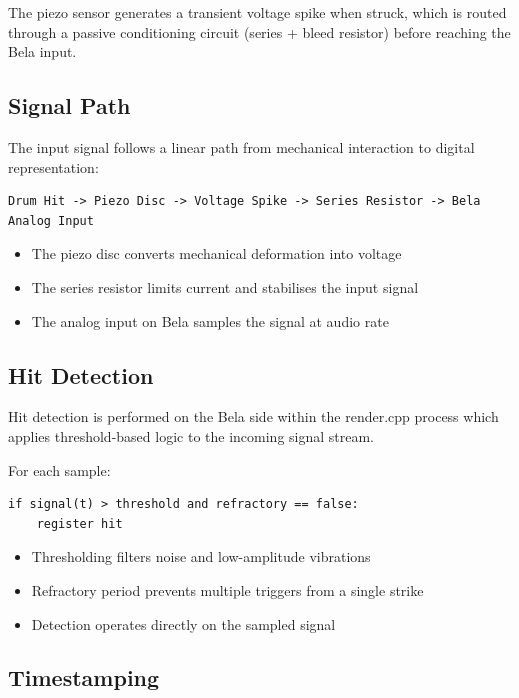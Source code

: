 The piezo sensor generates a transient voltage spike when struck, which
is routed through a passive conditioning circuit (series + bleed
resistor) before reaching the Bela input.

\subsection{Signal Path}\label{signal-path}

The input signal follows a linear path from mechanical interaction to
digital representation:

\begin{lstlisting}
Drum Hit -> Piezo Disc -> Voltage Spike -> Series Resistor -> Bela Analog Input
\end{lstlisting}

\begin{itemize}
\item
  The piezo disc converts mechanical deformation into voltage
\item
  The series resistor limits current and stabilises the input signal
\item
  The analog input on Bela samples the signal at audio rate
\end{itemize}

\subsection{Hit Detection}\label{hit-detection}

Hit detection is performed on the Bela side within the render.cpp
process which applies threshold-based logic to the incoming signal
stream.

For each sample:

\begin{lstlisting}
if signal(t) > threshold and refractory == false:
    register hit
\end{lstlisting}

\begin{itemize}
\item
  Thresholding filters noise and low-amplitude vibrations
\item
  Refractory period prevents multiple triggers from a single strike
\item
  Detection operates directly on the sampled signal
\end{itemize}

\subsection{Timestamping}\label{timestamping}

